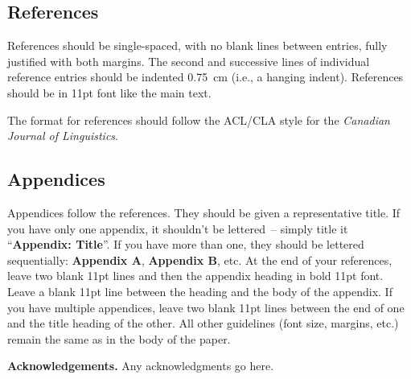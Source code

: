 \documentclass[xelatex,linguex]{TWPL}
\begin{document}
\subsection{References}

References should be single-spaced, with no blank lines between entries, fully justified with both margins. The second and successive lines of individual reference entries should be indented 0.75~cm (i.e., a hanging indent). References should be in 11pt font like the main text.

The format for references should follow the ACL/CLA style for the \emph{Canadian Journal of Linguistics}.

\subsection{Appendices}

Appendices follow the references. They should be given a representative title. If you have only one appendix, it shouldn't be lettered~– simply title it ``\textbf{Appendix: Title}''. If you have more than one, they should be lettered sequentially: \textbf{Appendix A}, \textbf{Appendix B}, etc. At the end of your references, leave two blank 11pt lines and then the appendix heading in bold 11pt font. Leave a blank 11pt line between the heading and the body of the appendix. If you have multiple appendices, leave two blank 11pt lines between the end of one and the title heading of the other. All other guidelines (font size, margins, etc.) remain the same as in the body of the paper.



\vspace{22pt}\noindent\textbf{Acknowledgements.} Any acknowledgments go here.



\nocite{Armon1996, Blevins2008a, Blevins2008b, Goldsmith1995, Kahnemuyipour2001, NakayamaArchibald2005, Reinhart1976, Rice1997, Writer1999, WriterToAppear}
\end{document}
